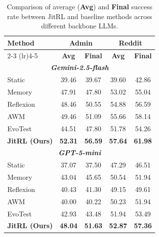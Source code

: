 \begin{table}[t]
  \caption{Comparison of average (\textbf{Avg}) and \textbf{Final} success rate between JitRL and baseline methods across different backbone LLMs.}
  \vskip 0.1in
  \label{tab:base_models}
  \begin{center}
    \begin{small}
        \begin{tabular}{lcccc}
          \toprule
          \multirow{2}{*}{\textbf{Method}} 
          & \multicolumn{2}{c}{\textbf{Admin}} 
          & \multicolumn{2}{c}{\textbf{Reddit}} \\
          \cmidrule(lr){2-3} \cmidrule(lr){4-5}
          & \textbf{Avg} & \textbf{Final}
          & \textbf{Avg} & \textbf{Final} \\
          
          \midrule
          \multicolumn{5}{c}{\textit{\textbf{Gemini-2.5-flash}}} \\ \addlinespace[2pt]
          Static & 39.46 & 39.67 & 39.60 & 42.86 \\
          Memory & 47.91 & 47.80 & 53.02 & 55.04 \\
          Reflexion & 48.46 & 50.55 & 54.88 & 56.59 \\
          AWM & 49.46 & 51.09 & 55.66 & 58.14 \\
          EvoTest & 44.51 & 47.80 & 51.78 & 54.26 \\
          \textbf{JitRL (Ours)} & \textbf{52.31} & \textbf{56.59} & \textbf{57.64} & \textbf{61.98} \\

          \midrule
          \multicolumn{5}{c}{\textit{\textbf{GPT-5-mini}}} \\ \addlinespace[2pt]
          Static & 37.07 & 37.50 & 47.29 & 46.51 \\
          Memory & 43.04 & 45.65 & 50.54 & 51.94 \\
          Reflexion & 40.43 & 41.30 & 49.15 & 49.61 \\
          AWM & 40.00 & 40.22 & 50.23 & 51.94 \\
          EvoTest & 42.93 & 43.48 & 51.94 & 53.49 \\
          \textbf{JitRL (Ours)} & \textbf{48.04} & \textbf{51.63} & \textbf{52.87} & \textbf{57.36} \\


\end{tabular}
\end{small}
\end{center}
\end{table}
